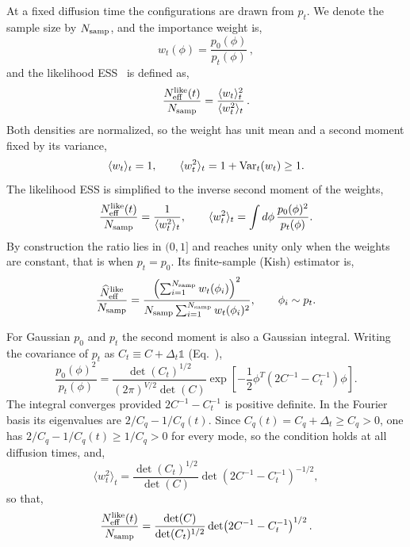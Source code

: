 \documentclass[reprint,twocolumn,superscriptaddress,preprintnumbers,amsmath,amssymb,aps,prd,floatfix]{revtex4-2}
\def\Eq#1{Eq.~\labelcref{#1}} \def\Eqs#1{Eqs.~\labelcref{#1}}
\begin{document}
At a fixed diffusion time the configurations are drawn from $p_t$. We denote the sample size by $N_{\rm samp}$, and the importance weight is,
\begin{equation}
w_t(\phi)=\frac{p_0(\phi)}{p_t(\phi)}\,,
\label{eq:free_likelihood_weight}
\end{equation}
and the likelihood ESS~\cite{Albergo:2021vyo} is defined as,
\begin{equation}
\frac{N_{\rm eff}^{\rm like}(t)}{N_{\rm samp}}
=\frac{\langle w_t\rangle_t^2}{\langle w_t^2\rangle_t}\,.
\label{eq:free_likelihood_ess_ratio}
\end{equation}
Both densities are normalized, so the weight has unit mean and a second moment fixed by its variance,
\begin{equation}
\langle w_t\rangle_t=1 ,
\qquad
\langle w_t^2\rangle_t=1+{\rm Var}_t(w_t)\ge 1 .
\label{eq:free_weight_moments}
\end{equation}
The likelihood ESS is simplified to the inverse second moment of the weights,
\begin{equation}
\frac{N_{\rm eff}^{\rm like}(t)}{N_{\rm samp}}
=\frac{1}{\langle w_t^2\rangle_t},
\qquad
\langle w_t^2\rangle_t=\int d\phi\,\frac{p_0(\phi)^2}{p_t(\phi)} .
\label{eq:free_likelihood_ess_def}
\end{equation}
By construction the ratio lies in $(0,1]$ and reaches unity only when the weights are constant, that is when $p_t=p_0$. Its finite-sample (Kish) estimator is,
\begin{equation}
\frac{\widehat N_{\rm eff}^{\rm like}}{N_{\rm samp}}
=\frac{\left(\sum_{i=1}^{N_{\rm samp}}w_t(\phi_i)\right)^2}
{N_{\rm samp}\sum_{i=1}^{N_{\rm samp}}w_t(\phi_i)^2},
\qquad \phi_i\sim p_t .
\label{eq:free_likelihood_ess_estimator}
\end{equation}

For Gaussian $p_0$ and $p_t$ the second moment is also a Gaussian integral. Writing the covariance of $p_t$ as $C_t\equiv C+\Delta_t\mathbb{1}$ (\Eq{eq:Ct_free}),
\begin{equation}
\frac{p_0(\phi)^2}{p_t(\phi)}
=\frac{\det(C_t)^{1/2}}{(2\pi)^{V/2}\det(C)}
\exp\!\left[-\frac{1}{2}\phi^T\!\left(2C^{-1}-C_t^{-1}\right)\phi\right] .
\label{eq:free_weight_square_density}
\end{equation}
The integral converges provided $2C^{-1}-C_t^{-1}$ is positive definite. In the Fourier basis its eigenvalues are $2/C_q-1/C_q(t)$. Since $C_q(t)=C_q+\Delta_t\ge C_q>0$, one has $2/C_q-1/C_q(t)\ge 1/C_q>0$ for every mode, so the condition holds at all diffusion times, and,
\begin{equation}
\langle w_t^2\rangle_t
=\frac{\det(C_t)^{1/2}}{\det(C)}
\det\!\left(2C^{-1}-C_t^{-1}\right)^{-1/2},
\label{eq:free_w2_matrix}
\end{equation}
so that,
\begin{equation}
\frac{N_{\rm eff}^{\rm like}(t)}{N_{\rm samp}}
=\frac{\det(C)}{\det(C_t)^{1/2}}
\det\!\left(2C^{-1}-C_t^{-1}\right)^{1/2} .
\label{eq:free_likelihood_ess_matrix}
\end{equation}
\end{document}
